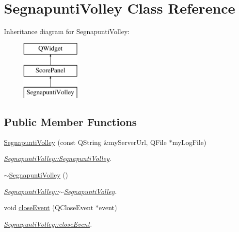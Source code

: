 \hypertarget{classSegnapuntiVolley}{}\section{Segnapunti\+Volley Class Reference}
\label{classSegnapuntiVolley}
Inheritance diagram for Segnapunti\+Volley\+:\begin{figure}[H]
\begin{center}
\leavevmode
\includegraphics[height=3.000000cm]{df/d83/classSegnapuntiVolley}
\end{center}
\end{figure}
\subsection*{Public Member Functions}
\begin{DoxyCompactItemize}
\item 
\mbox{\hyperlink{classSegnapuntiVolley_a2de6c112e896299739e17d8f2f297b5f}{Segnapunti\+Volley}} (const Q\+String \&my\+Server\+Url, Q\+File $\ast$my\+Log\+File)
\begin{DoxyCompactList}\small\item\em \mbox{\hyperlink{classSegnapuntiVolley_a2de6c112e896299739e17d8f2f297b5f}{Segnapunti\+Volley\+::\+Segnapunti\+Volley}}. \end{DoxyCompactList}\item 
\mbox{\label{classSegnapuntiVolley_ad8e5ab692214bb070d3c36b21726a631}} 
\mbox{\hyperlink{classSegnapuntiVolley_ad8e5ab692214bb070d3c36b21726a631}{$\sim$\+Segnapunti\+Volley}} ()
\begin{DoxyCompactList}\small\item\em \mbox{\hyperlink{classSegnapuntiVolley_ad8e5ab692214bb070d3c36b21726a631}{Segnapunti\+Volley\+::$\sim$\+Segnapunti\+Volley}}. \end{DoxyCompactList}\item 
void \mbox{\hyperlink{classSegnapuntiVolley_ae73348572db084086209753f299615fd}{close\+Event}} (Q\+Close\+Event $\ast$event)
\begin{DoxyCompactList}\small\item\em \mbox{\hyperlink{classSegnapuntiVolley_ae73348572db084086209753f299615fd}{Segnapunti\+Volley\+::close\+Event}}. \end{DoxyCompactList}\end{DoxyCompactItemize}
